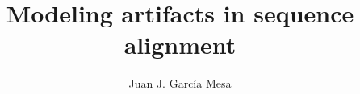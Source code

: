 

\title{Modeling artifacts in sequence alignment}
\author{Juan J. Garc\'{i}a Mesa}
\date{}


\maketitle









% 





\pagebreak

\printbibliography


